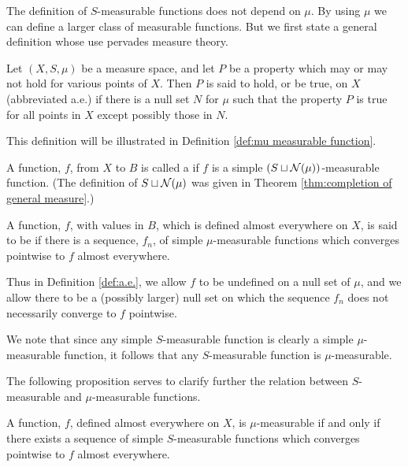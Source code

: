 The definition of $S$-measurable functions does not depend on $\mu$. By using $\mu$ we can define a larger class of measurable functions. But we first state a general definition whose use pervades measure theory.

\begin{definition}\label{def:a.e.}
Let $(X,S,\mu)$ be a measure space, and let $P$ be a property which may or may not hold for various points of $X$. Then $P$ is said to hold, or be true,  on $X$ (abbreviated a.e.) if there is a null set $N$ for $\mu$ such that the property $P$ is true for all points in $X$ except possibly those in $N$.
\end{definition}

This definition will be illustrated in Definition \ref{def:mu measurable function}.

\begin{definition}
A function, $f$, from $X$ to $B$ is called a  if $f$ is a simple $(S\sqcup{\cal N}(\mu))$-measurable function. (The definition of $S\sqcup{\cal N}(\mu)$ was given in Theorem \ref{thm:completion of general measure}.)
\end{definition}

\begin{definition}\label{def:mu measurable function}
A function, $f$, with values in $B$, which is defined almost everywhere on $X$, is said to be  if there is a sequence, $f_n$, of simple $\mu$-measurable functions which converges pointwise to $f$ almost everywhere.
\end{definition}

Thus in Definition \ref{def:a.e.}, we allow $f$ to be undefined on a null set of $\mu$, and we allow there to be a (possibly larger) null set on which the sequence $f_n$ does not necessarily converge to $f$ pointwise.

We note that since any simple $S$-measurable function is clearly a simple $\mu$-measurable function, it follows that any $S$-measurable function is $\mu$-measurable.

The following proposition serves to clarify further the relation between $S$-measurable and $\mu$-measurable functions.

\begin{proposition}
A function, $f$, defined almost everywhere on $X$, is $\mu$-measurable if and only if there exists a sequence of simple $S$-measurable functions which converges pointwise to $f$ almost everywhere.
\end{proposition}

